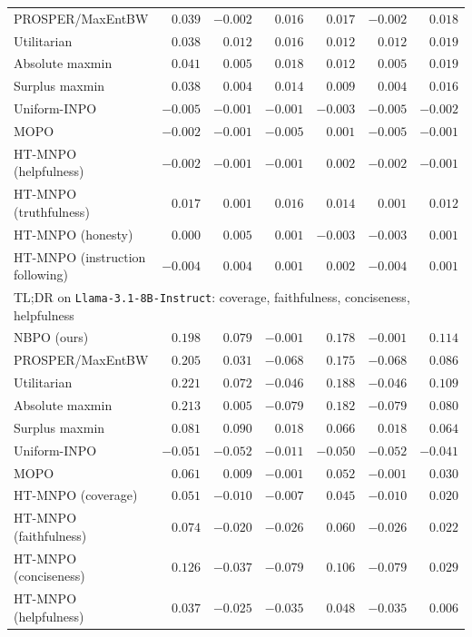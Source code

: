 \documentclass{article}
\theoremstyle{remark}
\theoremstyle{plain}
\newcommand{\NBPO}{\textsc{NBPO}}
\begin{document}
\begin{table}[t]
\begin{tabular}{lrrrrrr}
PROSPER/MaxEntBW & $0.039$ & $-0.002$ & $0.016$ & $0.017$ & $-0.002$ & $0.018$\\
Utilitarian & $0.038$ & $0.012$ & $0.016$ & $0.012$ & $0.012$ & $0.019$\\
Absolute maxmin & $0.041$ & $0.005$ & $0.018$ & $0.012$ & $0.005$ & $0.019$\\
Surplus maxmin & $0.038$ & $0.004$ & $0.014$ & $0.009$ & $0.004$ & $0.016$\\
Uniform-INPO & $-0.005$ & $-0.001$ & $-0.001$ & $-0.003$ & $-0.005$ & $-0.002$\\
MOPO & $-0.002$ & $-0.001$ & $-0.005$ & $0.001$ & $-0.005$ & $-0.001$\\
HT-MNPO (helpfulness) & $-0.002$ & $-0.001$ & $-0.001$ & $0.002$ & $-0.002$ & $-0.001$\\
HT-MNPO (truthfulness) & $0.017$ & $0.001$ & $0.016$ & $0.014$ & $0.001$ & $0.012$\\
HT-MNPO (honesty) & $0.000$ & $0.005$ & $0.001$ & $-0.003$ & $-0.003$ & $0.001$\\
HT-MNPO (instruction following) & $-0.004$ & $0.004$ & $0.001$ & $0.002$ & $-0.004$ & $0.001$\\
\midrule
\multicolumn{7}{l}{\textsc{TL;DR} on \texttt{Llama-3.1-8B-Instruct}: coverage, faithfulness, conciseness, helpfulness}\\
\NBPO{} (ours) & $0.198$ & $0.079$ & $-0.001$ & $0.178$ & $-0.001$ & $0.114$\\
PROSPER/MaxEntBW & $0.205$ & $0.031$ & $-0.068$ & $0.175$ & $-0.068$ & $0.086$\\
Utilitarian & $0.221$ & $0.072$ & $-0.046$ & $0.188$ & $-0.046$ & $0.109$\\
Absolute maxmin & $0.213$ & $0.005$ & $-0.079$ & $0.182$ & $-0.079$ & $0.080$\\
Surplus maxmin & $0.081$ & $0.090$ & $0.018$ & $0.066$ & $0.018$ & $0.064$\\
Uniform-INPO & $-0.051$ & $-0.052$ & $-0.011$ & $-0.050$ & $-0.052$ & $-0.041$\\
MOPO & $0.061$ & $0.009$ & $-0.001$ & $0.052$ & $-0.001$ & $0.030$\\
HT-MNPO (coverage) & $0.051$ & $-0.010$ & $-0.007$ & $0.045$ & $-0.010$ & $0.020$\\
HT-MNPO (faithfulness) & $0.074$ & $-0.020$ & $-0.026$ & $0.060$ & $-0.026$ & $0.022$\\
HT-MNPO (conciseness) & $0.126$ & $-0.037$ & $-0.079$ & $0.106$ & $-0.079$ & $0.029$\\
HT-MNPO (helpfulness) & $0.037$ & $-0.025$ & $-0.035$ & $0.048$ & $-0.035$ & $0.006$\\

\end{tabular}
\end{table}
\end{document}
